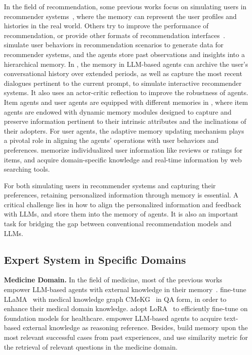 \documentclass{article}
\theoremstyle{definition}
\theoremstyle{theorem}
\theoremstyle{proof}
\theoremstyle{remark}
\begin{document}
	In the field of recommendation, some previous works focus on simulating users in recommender systems~\cite{recagent,interecagent}, where the memory can represent the user profiles and histories in the real world.
	Others try to improve the performance of recommendation, or provide other formats of recommendation interfaces~\cite{zhang2023agentcf,recmind}.
	\citet{recagent} simulate user behaviors in recommendation scenarios to generate data for recommender systems, and the agents store past observations and insights into a hierarchical memory. In \citet{interecagent}, the memory in LLM-based agents can archive the user's conversational history over extended periods, as well as capture the most recent dialogues pertinent to the current prompt, to simulate interactive recommender systems. It also uses an actor-critic reflection to improve the robustness of agents. 
	Item agents and user agents are equipped with different memories in \cite{zhang2023agentcf}, where item agents are endowed with dynamic memory modules designed to capture and preserve information pertinent to their intrinsic attributes and the inclinations of their adopters. For user agents, the adaptive memory updating mechanism plays a pivotal role in aligning the agents' operations with user behaviors and preferences.
	\citet{recmind} memorize individualized user information like reviews or ratings for items, and acquire domain-specific knowledge and real-time information by web searching tools.
	
	For both simulating users in recommender systems and capturing their preferences, retaining personalized information through memory is essential. A critical challenge lies in how to align the personalized information and feedback with LLMs, and store them into the memory of agents. It is also an important task for bridging the gap between conventional recommendation models and LLMs.
	
	\subsection{Expert System in Specific Domains}
	
	\textbf{Medicine Domain.}
	In the field of medicine, most of the previous works empower LLM-based agents with external knowledge in their memory~\cite{huatuo,doctorglm,radiology_gpt,cmedknowqa,chatdoctor}. \citet{huatuo} fine-tune LLaMA~\cite{llama} with medical knowledge graph CMeKG~\cite{cmekg} in QA form, in order to enhance their medical domain knowledge. \citet{doctorglm} adopt LoRA~\cite{lora} to efficiently fine-tune on foundation models for healthcare. \citet{cmedknowqa} empower LLM-based agents to acquire text-based external knowledge as reasoning reference. Besides, \citet{ehragent} build memory upon the most relevant successful cases from past experiences, and use similarity metric for the retrieval of relevant questions in the medicine domain.
	
\end{document}
